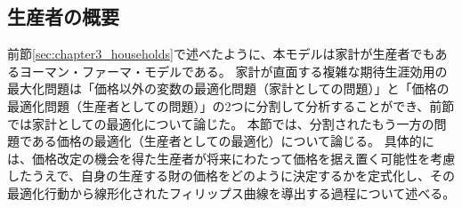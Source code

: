 
\subsection{生産者の概要}
\label{sec:chapter3_producers_overview}
前節\ref{sec:chapter3_households}で述べたように、本モデルは家計が生産者でもあるヨーマン・ファーマ・モデルである。
家計が直面する複雑な期待生涯効用の最大化問題は「価格以外の変数の最適化問題（家計としての問題）」と「価格の最適化問題（生産者としての問題）」の2つに分割して分析することができ、前節では家計としての最適化について論じた。
本節では、分割されたもう一方の問題である価格の最適化（生産者としての最適化）について論じる。
具体的には、価格改定の機会を得た生産者が将来にわたって価格を据え置く可能性を考慮したうえで、自身の生産する財の価格をどのように決定するかを定式化し、その最適化行動から線形化されたフィリップス曲線を導出する過程について述べる。